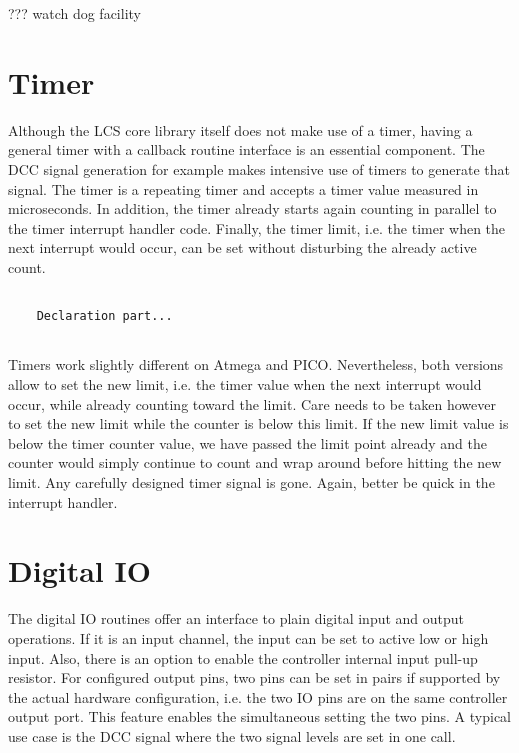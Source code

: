 ??? watch dog facility


\section{Timer}

Although the LCS core library itself does not make use of a timer, having a general timer with a callback routine interface is an essential component. The DCC signal generation for example makes intensive use of timers to generate that signal. The timer is a repeating timer and accepts a timer value measured in microseconds. In addition, the timer already starts again counting in parallel to the timer interrupt handler code. Finally, the timer limit, i.e. the timer when the next interrupt would occur, can be set without disturbing the already active count.

\lstset{language=c++, style=codesnippetstyle}
\begin{lstlisting}
   
    Declaration part...
    
\end{lstlisting}
\FloatBarrier

Timers work slightly different on Atmega and PICO. Nevertheless, both versions allow to set the new limit, i.e. the timer value when the next interrupt would occur, while already counting toward the limit. Care needs to be taken however to set the new limit while the counter is below this limit. If the new limit value is below the timer counter value, we have passed the limit point already and the counter would simply continue to count and wrap around before hitting the new limit. Any carefully designed timer signal is gone. Again, better be quick in the interrupt handler.

\section{Digital IO}

The digital IO routines offer an interface to plain digital input and output operations. If it is an input channel, the input can be set to active low or high input. Also, there is an option to enable the controller internal input pull-up resistor. For configured output pins, two pins can be set in pairs if supported by the actual hardware configuration, i.e. the two IO pins are on the same controller output port. This feature enables the simultaneous setting the two pins. A typical use case is the DCC signal where the two signal levels are set in one call.


